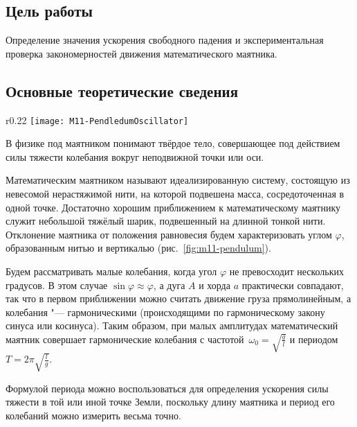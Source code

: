 \documentclass[a4paper, 12pt]{extarticle}
\begin{document}
\MTDTitlePage
\MTDInfoPage

\setcounter{section}{11}

\subsection{Цель работы}
Определение значения ускорения свободного падения и экспериментальная проверка закономерностей движения математического маятника. 

\subsection{Основные теоретические сведения}

\begin{wrapfigure}{r}{0.22\textwidth}
 \centering
\texttt{[image: M11-PendledumOscillator]}
\caption{\label{fig:m11-pendulum}}
\end{wrapfigure}

В физике под маятником понимают твёрдое тело, совершающее под действием силы тяжести колебания вокруг неподвижной точки или оси. 

Математическим маятником называют идеализированную систему, состоящую из невесомой нерастяжимой нити, на которой подвешена масса, сосредоточенная в одной точке. Достаточно хорошим приближением к математическому маятнику служит небольшой тяжёлый шарик, подвешенный на длинной тонкой нити. Отклонение маятника от положения равновесия будем характеризовать углом $\varphi$, образованным нитью и вертикалью (рис.~\ref{fig:m11-pendulum}). %

Будем рассматривать малые колебания, когда угол $\varphi$ не превосходит нескольких градусов. В этом случае $\sin \varphi \approx \varphi$, а дуга $A$ и хорда $a$ практически совпадают, так что в первом приближении можно считать движение груза прямолинейным, а колебания "--- гармоническими (происходящими по гармоническому закону синуса или косинуса). Таким образом, при малых амплитудах математический маятник совершает гармонические колебания с частотой~$\omega_0 = \sqrt{\frac{g}{l}}$ и периодом~$T = 2 \pi \sqrt{\frac{l}{g}}$. %

Формулой периода можно воспользоваться для определения ускорения силы тяжести в той или иной точке Земли, поскольку длину маятника и период его колебаний можно измерить весьма точно. 
\end{document}
